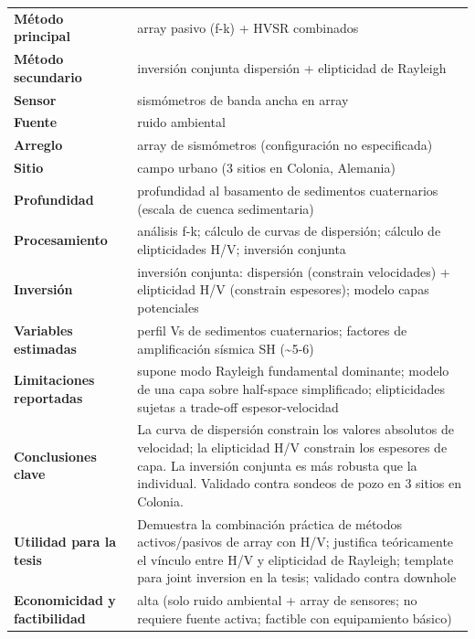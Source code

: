 \begin{center}\scriptsize
\begin{tabularx}{\textwidth}{@{}>{\bfseries}p{3.3cm} X@{}}
\toprule
M\'etodo principal & array pasivo (f-k) + HVSR combinados \\
M\'etodo secundario & inversión conjunta dispersión + elipticidad de Rayleigh \\
Sensor & sismómetros de banda ancha en array \\
Fuente & ruido ambiental \\
Arreglo & array de sismómetros (configuración no especificada) \\
Sitio & campo urbano (3 sitios en Colonia, Alemania) \\
Profundidad & profundidad al basamento de sedimentos cuaternarios (escala de cuenca sedimentaria) \\
Procesamiento & análisis f-k; cálculo de curvas de dispersión; cálculo de elipticidades H/V; inversión conjunta \\
Inversi\'on & inversión conjunta: dispersión (constrain velocidades) + elipticidad H/V (constrain espesores); modelo capas potenciales \\
Variables estimadas & perfil Vs de sedimentos cuaternarios; factores de amplificación sísmica SH (\textasciitilde{}5-6) \\
Limitaciones reportadas & supone modo Rayleigh fundamental dominante; modelo de una capa sobre half-space simplificado; elipticidades sujetas a trade-off espesor-velocidad \\
Conclusiones clave & La curva de dispersión constrain los valores absolutos de velocidad; la elipticidad H/V constrain los espesores de capa. La inversión conjunta es más robusta que la individual. Validado contra sondeos de pozo en 3 sitios en Colonia. \\
Utilidad para la tesis & Demuestra la combinación práctica de métodos activos/pasivos de array con H/V; justifica teóricamente el vínculo entre H/V y elipticidad de Rayleigh; template para joint inversion en la tesis; validado contra downhole \\
Economicidad y factibilidad & alta (solo ruido ambiental + array de sensores; no requiere fuente activa; factible con equipamiento básico) \\
\bottomrule
\end{tabularx}
\end{center}

